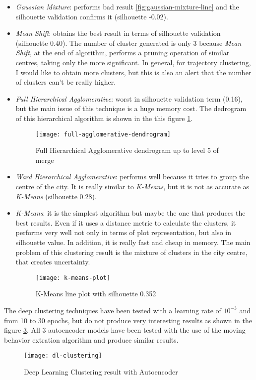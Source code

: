 \begin{itemize}
	\item \textit{Gaussian Mixture}: performs bad result \ref{fig:gaussian-mixture-line} and the silhouette validation confirms it (silhouette -0.02).
	
	\item \textit{Mean Shift}: obtains the best result in terms of silhouette validation (silhouette 0.40). The number of cluster generated is only 3 because \textit{Mean Shift}, at the end of algorithm, performs a pruning operation of similar centres, taking only the more significant. In general, for trajectory clustering, I would like to obtain more clusters, but this is also an alert that the number of clusters can't be really higher. 
	
	\item \textit{Full Hierarchical Agglomerative}: worst in silhouette validation term (0.16), but the main issue of this technique is a huge memory cost. The dedrogram of this hierarchical algorithm is shown in the this figure \ref{fig:full-agglomerative-dendrogram}. 
	
	\begin{figure}[bt]
		\centering
		\texttt{[image: full-agglomerative-dendrogram]}
		\caption{Full Hierarchical Agglomerative dendrogram up to level 5 of merge}
		\label{fig:full-agglomerative-dendrogram}
	\end{figure}
	
	\item \textit{Ward Hierarchical Agglomerative}: performs well because it tries to group the centre of the city. It is really similar to \textit{K-Means}, but it is not as accurate as \textit{K-Means} (silhouette 0.28).

	\item \textit{K-Means}: it is the simplest algorithm but maybe the one that produces the best results. Even if it uses a distance metric to calculate the clusters, it performs very well not only in terms of plot representation, but also in silhouette value. In addition, it is really fast and cheap in memory. The main problem of this clustering result is the mixture of clusters in the city centre, that creates uncertainty.
	
	\begin{figure}[bt]
		\centering
		\texttt{[image: k-means-plot]}
		\caption{K-Means line plot with silhouette 0.352}
		\label{fig:k-means-line}
	\end{figure}
\end{itemize}

The deep clustering techniques have been tested with a learning rate of $10^{-3}$ and from 10 to 30 epochs, but do not produce very interesting results as shown in the figure \ref{fig:dl-clustering}. All 3 autoencoder models have been tested with the use of the moving behavior extration algorithm and produce similar results.

\begin{figure}[bt]
	\centering
	\texttt{[image: dl-clustering]}
	\caption{Deep Learning Clustering result with Autoencoder}
	\label{fig:dl-clustering}
\end{figure}